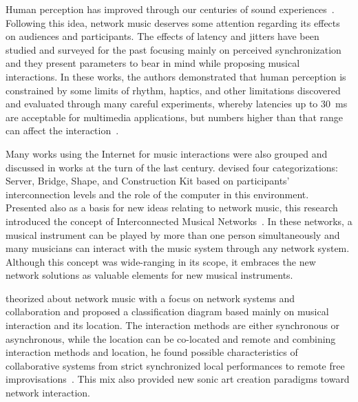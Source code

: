 Human perception has improved through our centuries of sound experiences~\citep{Jourdain1997music}.
Following this idea, network music deserves some attention regarding its effects on audiences and participants.
The effects of latency and jitters have been studied and surveyed for the past focusing mainly on perceived synchronization and they present parameters to bear in mind while proposing musical interactions.
In these works, the authors demonstrated that human perception is constrained by some limits of rhythm, haptics, and other limitations discovered and evaluated through many careful experiments, whereby latencies up to 30~ms are acceptable for multimedia applications, but numbers higher than that range can affect the interaction~\citep{Schuett2002effects,Lago2004thequest,Rottondi2016overview}.

Many works using the Internet for music interactions were also grouped and discussed in works at the turn of the last century.
\cite{Weinberg2003} devised four categorizations: Server, Bridge, Shape, and Construction Kit based on participants' interconnection levels and the role of the computer in this environment.
Presented also as a basis for new ideas relating to network music, this research introduced the concept of Interconnected Musical Networks~\citep{Weinberg2005interconnected}. 
In these networks, a musical instrument can be played by more than one person simultaneously and many musicians can interact with the music system through any network system.
Although this concept was wide-ranging in its scope, it embraces the new network solutions as valuable elements for new musical instruments.

\cite{Barbosa2003dispacedsoundscapes} theorized about network music with a focus on network systems and collaboration and proposed a classification diagram based mainly on musical interaction and its location.
The interaction methods are either synchronous or asynchronous, while the location can be co-located and remote and combining interaction methods and location, he found possible characteristics of collaborative systems from strict synchronized local performances to remote free improvisations~\citep{Barbosa2003dispacedsoundscapes}.
This mix also provided new sonic art creation paradigms toward network interaction.

